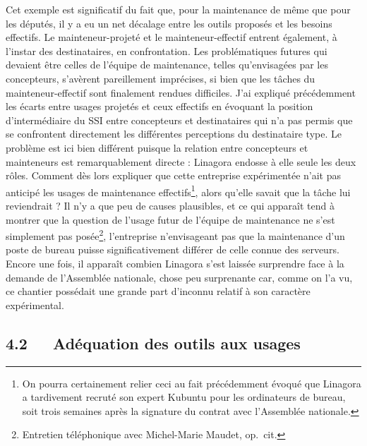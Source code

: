 \documentclass{FramateX}
\begin{document}
\begin{refsection}
Cet exemple est significatif du fait que, pour la maintenance de
même que pour les députés, il y a eu un net décalage entre les
outils proposés et les besoins effectifs. Le mainteneur-projeté et le mainteneur-effectif entrent
également, à l'instar des destinataires, en confrontation. Les
problématiques futures qui devaient être celles de l'équipe de
maintenance, telles qu'envisagées par les concepteurs, s'avèrent
pareillement imprécises, si bien que les tâches du
mainteneur-effectif sont finalement rendues difficiles. J'ai
expliqué précédemment les écarts entre usages projetés et ceux
effectifs en évoquant la position d'intermédiaire du SSI entre
concepteurs et destinataires qui n'a pas permis que se confrontent
directement les différentes perceptions du destinataire type. Le
problème est ici bien différent puisque la relation entre concepteurs
et mainteneurs est remarquablement directe : Linagora endosse à elle
seule les deux rôles. Comment dès lors expliquer que cette entreprise
expérimentée n'ait pas anticipé les usages de maintenance
effectifs\footnote{On pourra certainement relier ceci au fait
précédemment évoqué que Linagora a tardivement recruté son expert
Kubuntu pour les ordinateurs de bureau, soit trois semaines après la
signature du contrat avec l'Assemblée nationale.}, alors
qu'elle savait que la tâche lui reviendrait ? Il n'y a que peu de
causes plausibles, et ce qui apparaît tend à montrer que la question de
l'usage futur de l'équipe de maintenance ne s'est simplement pas
posée\footnote{Entretien téléphonique avec Michel-Marie
Maudet, op.~cit.}, l'entreprise n'envisageant pas que la
maintenance d'un poste de bureau puisse significativement différer de
celle connue des serveurs. Encore une fois, il apparaît combien
Linagora s'est laissée surprendre face à la demande de l'Assemblée
nationale, chose peu surprenante car, comme on l'a vu, ce chantier
possédait une grande part d'inconnu relatif à son caractère
expérimental.

\subsection*{4.2~~~Adéquation des outils aux usages}
{}


\end{refsection}
\end{document}
